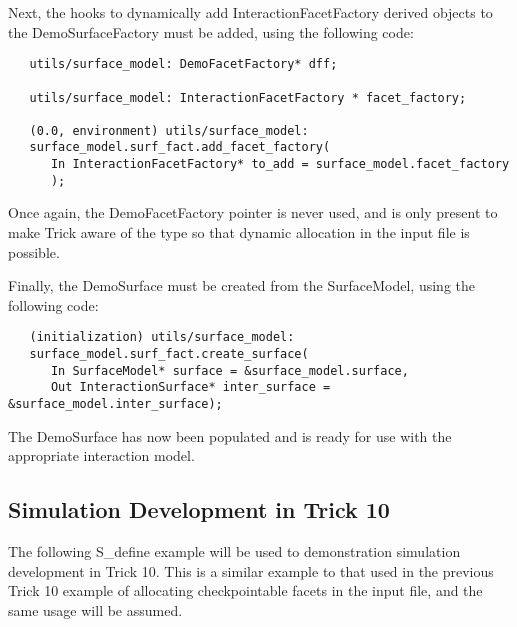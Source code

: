 Next, the hooks to dynamically add InteractionFacetFactory derived
objects to the DemoSurfaceFactory must be added, using the following
code:

\begin{verbatim}
   utils/surface_model: DemoFacetFactory* dff;

   utils/surface_model: InteractionFacetFactory * facet_factory;

   (0.0, environment) utils/surface_model:
   surface_model.surf_fact.add_facet_factory(
      In InteractionFacetFactory* to_add = surface_model.facet_factory
      );
\end{verbatim}

Once again, the DemoFacetFactory pointer is never used, and is only
present to make Trick aware of the type so that dynamic allocation in the
input file is possible.

Finally, the DemoSurface must be created from the SurfaceModel, using
the following code:

\begin{verbatim}
   (initialization) utils/surface_model:
   surface_model.surf_fact.create_surface(
      In SurfaceModel* surface = &surface_model.surface,
      Out InteractionSurface* inter_surface = &surface_model.inter_surface);
\end{verbatim}

The DemoSurface has now been populated and is ready for use
with the appropriate interaction model.


\subsection{Simulation Development in Trick 10}

The following S\_define example will be used to demonstration simulation development in Trick 10.
This is a similar example to that used in the previous Trick 10 example of allocating checkpointable
facets in the input file, and the same usage will be assumed.

